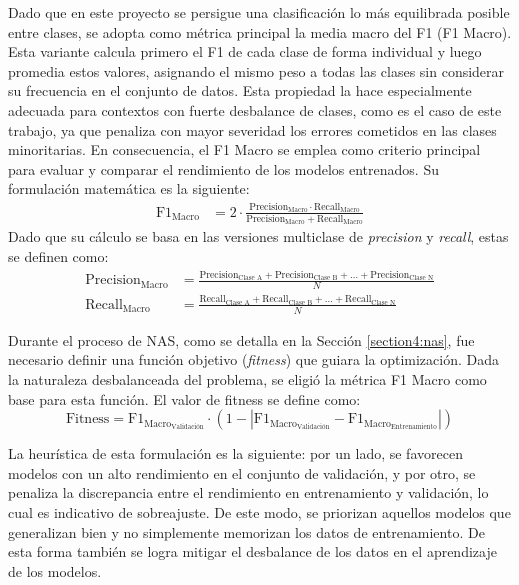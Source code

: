 Dado que en este proyecto se persigue una clasificación lo más equilibrada posible entre clases, se adopta como métrica principal la media macro del F1 (F1 Macro). Esta variante calcula primero el F1 de cada clase de forma individual y luego promedia estos valores, asignando el mismo peso a todas las clases sin considerar su frecuencia en el conjunto de datos. Esta propiedad la hace especialmente adecuada para contextos con fuerte desbalance de clases, como es el caso de este trabajo, ya que penaliza con mayor severidad los errores cometidos en las clases minoritarias. En consecuencia, el F1 Macro se emplea como criterio principal para evaluar y comparar el rendimiento de los modelos entrenados. Su formulación matemática es la siguiente:
\begin{align}
    \text{F1}_{\text{Macro}} &=  2 \cdot \frac{\text{Precision}_{\text{Macro}} \cdot \text{Recall}_{\text{Macro}}}{\text{Precision}_{\text{Macro}} + \text{Recall}_{\text{Macro}}} 
\end{align}
Dado que su cálculo se basa en las versiones multiclase de \textit{precision} y \textit{recall}, estas se definen como:
\begin{align}
    \text{Precision}_{\text{Macro}} &= \frac{\text{Precision}_{\text{Clase A}}+\text{Precision}_{\text{Clase B}}+\dots+\text{Precision}_{\text{Clase N}}}{N} \\
    \text{Recall}_{\text{Macro}} &= \frac{\text{Recall}_{\text{Clase A}}+\text{Recall}_{\text{Clase B}}+\dots+\text{Recall}_{\text{Clase N}}}{N}
\end{align}

Durante el proceso de NAS, como se detalla en la Sección \ref{section4:nas}, fue necesario definir una función objetivo (\textit{fitness}) que guiara la optimización. Dada la naturaleza desbalanceada del problema, se eligió la métrica F1 Macro como base para esta función. El valor de fitness se define como:
\begin{equation}
    \text{Fitness} = \text{F1}_{\text{Macro}_{\text{Validación}}} \cdot (1 - | \text{F1}_{\text{Macro}_{\text{Validación}}} -  \text{F1}_{\text{Macro}_{\text{Entrenamiento}}}|)
\end{equation}

La heurística de esta formulación es la siguiente: por un lado, se favorecen modelos con un alto rendimiento en el conjunto de validación, y por otro, se penaliza la discrepancia entre el rendimiento en entrenamiento y validación, lo cual es indicativo de sobreajuste. De este modo, se priorizan aquellos modelos que generalizan bien y no simplemente memorizan los datos de entrenamiento. De esta forma también se logra mitigar el desbalance de los datos en el aprendizaje de los modelos.

